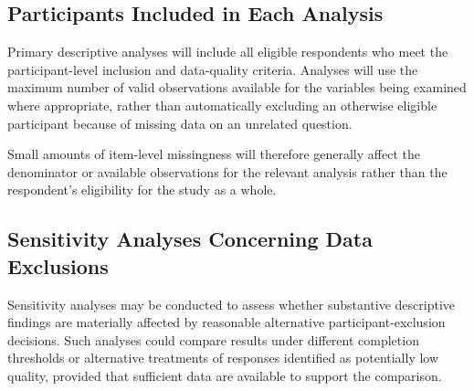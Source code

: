 
\subsection{Participants Included in Each Analysis}

Primary descriptive analyses will include all eligible respondents who meet the participant-level inclusion and data-quality criteria. Analyses will use the maximum number of valid observations available for the variables being examined where appropriate, rather than automatically excluding an otherwise eligible participant because of missing data on an unrelated question.

Small amounts of item-level missingness will therefore generally affect the denominator or available observations for the relevant analysis rather than the respondent's eligibility for the study as a whole.


\subsection{Sensitivity Analyses Concerning Data Exclusions}


Sensitivity analyses may be conducted to assess whether substantive descriptive findings are materially affected by reasonable alternative participant-exclusion decisions. Such analyses could compare results under different completion thresholds or alternative treatments of responses identified as potentially low quality, provided that sufficient data are available to support the comparison.

